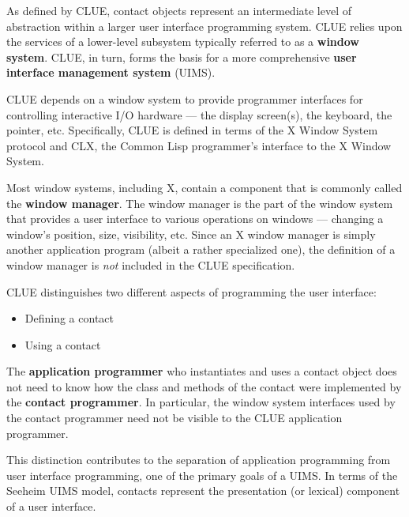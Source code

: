 \documentclass[twoside]{book}
\begin{document}
\begin{sloppy}
As defined by CLUE, contact objects represent an intermediate level of
abstraction within a larger user interface programming system.
CLUE relies upon the services of a lower-level subsystem typically referred to as
a {\bf window system}. CLUE, in turn, forms the basis for a
more comprehensive {\bf user interface management system}
(UIMS).

CLUE depends on a window system to provide programmer interfaces for controlling
interactive I/O hardware  --- the display screen(s), the keyboard, the
pointer, etc. Specifically, CLUE is defined in
terms of the X Window System protocol\cite{x-protocol} and CLX, the
Common Lisp programmer's interface to the X Window System\cite{clx}. 

Most window systems, including X, contain a component that is commonly called the 
{\bf window manager}. The window manager is the
part of the window system that provides a user interface to various operations on
windows --- changing a window's position, size, visibility, etc.
Since an X window manager is simply another application program (albeit a rather
specialized one), the
definition of a window manager is {\em not} included in the CLUE specification.

CLUE distinguishes two different aspects of programming the user
interface:

\begin{itemize}

\item Defining a contact

\item Using a contact

\end{itemize}

The {\bf application programmer} who
instantiates and uses a contact object does not need to know how the
class and methods of the contact were implemented by the {\bf contact
  programmer}. In particular, the window
system interfaces used by the contact programmer need not be visible
to the CLUE application programmer.

This distinction contributes to the separation of application
programming from user interface programming, one of the primary goals
of a UIMS. In terms of the Seeheim UIMS model\cite{pfaff-uims},
contacts represent the presentation (or lexical) component of a user
interface.  


\end{sloppy}
\end{document}
